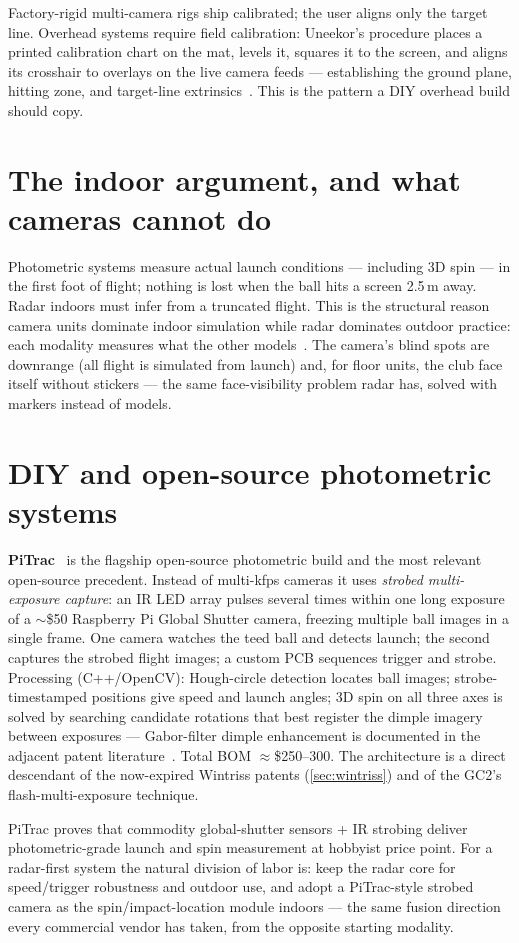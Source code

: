 Factory-rigid multi-camera rigs ship calibrated; the user aligns only the
target line. Overhead systems require field calibration: Uneekor's
procedure places a printed calibration chart on the mat, levels it,
squares it to the screen, and aligns its crosshair to overlays on the
live camera feeds --- establishing the ground plane, hitting zone, and
target-line extrinsics~\cite{uneekorcalib}. This is the pattern a DIY
overhead build should copy.

\section{The indoor argument, and what cameras cannot do}

Photometric systems measure actual launch conditions --- including 3D spin
--- in the first foot of flight; nothing is lost when the ball hits a
screen 2.5\,m away. Radar indoors must infer from a truncated flight.
This is the structural reason camera units dominate indoor simulation
while radar dominates outdoor practice: each modality measures what the
other models~\cite{uneekorphotometric}. The camera's blind spots are
downrange (all flight is simulated from launch) and, for floor units, the
club face itself without stickers --- the same face-visibility problem
radar has, solved with markers instead of models.

\section{DIY and open-source photometric systems}
\label{sec:diy}

\textbf{PiTrac}~\cite{pitrac} is the flagship open-source photometric
build and the most relevant open-source precedent. Instead of
multi-kfps cameras it uses \emph{strobed multi-exposure capture}: an IR
LED array pulses several times within one long exposure of a $\sim$\$50
Raspberry Pi Global Shutter camera, freezing multiple ball images in a
single frame. One camera watches the teed ball and detects launch; the
second captures the strobed flight images; a custom PCB sequences
trigger and strobe. Processing (C++/OpenCV): Hough-circle detection
locates ball images; strobe-timestamped positions give speed and launch
angles; 3D spin on all three axes is solved by searching candidate
rotations that best register the dimple imagery between exposures ---
Gabor-filter dimple enhancement is documented in the adjacent patent
literature~\cite{us12401909}. Total BOM $\approx$\$250--300. The
architecture is a direct descendant of the now-expired Wintriss patents
(\cref{sec:wintriss}) and of the GC2's flash-multi-exposure technique.

\begin{implication}
PiTrac proves that commodity global-shutter sensors + IR strobing deliver
photometric-grade launch and spin measurement at hobbyist price
point. For a radar-first system the natural division of labor is: keep the radar
core for speed/trigger robustness and outdoor use, and adopt a
PiTrac-style strobed camera as the spin/impact-location module indoors
--- the same fusion direction every commercial vendor has taken, from the
opposite starting modality.
\end{implication}
